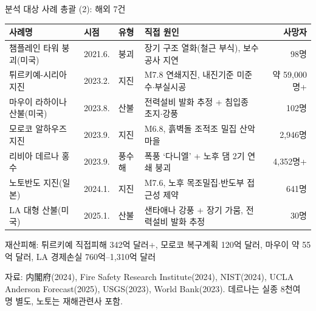\documentclass[aspectratio=169,10pt]{beamer}
\newcommand{\src}[1]{\par\vfill{\tiny\color{muted}#1}}
\begin{document}
\begin{frame}{분석 대상 사례 총괄 (2): 해외 7건}
  \footnotesize
  \begin{tabularx}{\textwidth}{@{}l l l Y r@{}}
    \toprule
    사례명 & 시점 & 유형 & 직접 원인 & 사망자 \\
    \midrule
    챔플레인 타워 붕괴(미국) & 2021.6. & 붕괴 & 장기 구조 열화(철근 부식), 보수공사 지연 & 98명 \\
    튀르키예-시리아 지진 & 2023.2. & 지진 & M7.8 연쇄지진, 내진기준 미준수$\cdot$부실시공 & 약 59,000명+ \\
    마우이 라하이나 산불(미국) & 2023.8. & 산불 & 전력설비 발화 추정 + 침입종 초지$\cdot$강풍 & 102명 \\
    모로코 알하우즈 지진 & 2023.9. & 지진 & M6.8, 흙벽돌 조적조 밀집 산악마을 & 2,946명 \\
    리비아 데르나 홍수 & 2023.9. & 풍수해 & 폭풍 `다니엘' + 노후 댐 2기 연쇄 붕괴 & 4,352명+ \\
    노토반도 지진(일본) & 2024.1. & 지진 & M7.6, 노후 목조밀집$\cdot$반도부 접근성 제약 & 641명 \\
    LA 대형 산불(미국) & 2025.1. & 산불 & 샌타애나 강풍 + 장기 가뭄, 전력설비 발화 추정 & 30명 \\
    \bottomrule
  \end{tabularx}
  \par\vspace{8pt}
  {\scriptsize 재산피해: 튀르키예 직접피해 342억 달러+, 모로코 복구계획 120억 달러, 마우이 약 55억 달러, LA 경제손실 760억--1,310억 달러}
  \src{자료: 内閣府(2024), Fire Safety Research Institute(2024), NIST(2024), UCLA Anderson Forecast(2025), USGS(2023), World Bank(2023). 데르나는 실종 8천여 명 별도, 노토는 재해관련사 포함.}
\end{frame}
\end{document}
